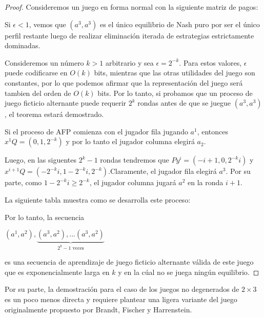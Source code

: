 \begin{proof}
    Consideremos un juego en forma normal con la siguiente matriz de pagos:

    

    Si $\epsilon < 1$, vemos que $(a^3, a^3)$ es el único equilibrio de Nash puro por ser el único perfil restante luego de realizar eliminación iterada de estrategias estrictamente dominadas.

    Consideremos un número $k > 1$ arbitrario y sea $\epsilon = 2^{-k}$. Para estos valores, $\epsilon$ puede codificarse en $O(k)$ bits, mientras que las otras utilidades del juego son constantes, por lo que podemos afirmar que la representación del juego será tambien del orden de  $O(k)$ bits. Por lo tanto, si probamos que un proceso de juego ficticio alternante puede requerir $2^k$ rondas antes de que se juegue $(a^3, a^3)$, el teorema estará demostrado.

    Si el proceso de AFP comienza con el jugador fila jugando $a^1$, entonces $x^1Q = (0, 1, 2^{-k})$ y por lo tanto el jugador columna elegirá $a_2$.

    Luego, en las siguentes $2^k - 1$ rondas tendremos que $Py^i = (-i + 1, 0, 2^{-k}i)$ y $x^{i+1}Q = (-2^{-k}i, 1 - 2^{-k}i, 2^{-k})$.Claramente, el jugador fila elegirá $a^3$. Por su parte, como $1 - 2^{-k}i \ge 2^{-k}$, el jugador columna jugará $a^2$ en la ronda $i + 1$.

    La siguiente tabla muestra como se desarrolla este proceso:

    

    Por lo tanto, la secuencia

    \begin{center}
    \begin{math}
        (a^1, a^2), \underbrace{(a^3, a^2), ... (a^3, a^2)}_{\text{$2^k - 1$ veces}}
    \end{math}
    \end{center}

    es una secuencia de aprendizaje de juego ficticio alternante válida de este juego que es exponencialmente larga en $k$ y en la cúal no se juega ningún equilibrio.
\end{proof}

Por su parte, la demostración para el caso de los juegos no degenerados de $2 \times 3$ es un poco menos directa y requiere plantear una ligera variante del juego originalmente propuesto por Brandt, Fischer y Harrenstein.

